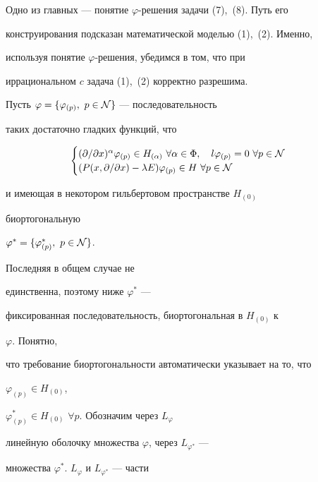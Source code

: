  


Одно из главных --- понятие $\varphi$-решения задачи (7),~(8). Путь его 


конструирования подсказан математической моделью (1),~(2). Именно, 


используя понятие $\varphi$-решения, убедимся в том, что при 


иррациональном $c$ задача (1),~(2) корректно разрешима. 


 


Пусть $\varphi=\{\varphi_{(p)},\ p\in\cal N\}$ --- последовательность 


таких достаточно гладких функций, что 


\begin{equation}


\begin{cases} 


(\partial/\partial x)^\alpha\varphi_{(p)}\in H_{(\alpha)} 


\ \forall\alpha\in\Phi,\quad l\varphi_{(p)}=0\ \forall p\in \cal N\\ 


(P(x,\partial/\partial x)-\lambda E)\varphi_{(p)}\in H 


\ \forall p\in\cal N 


\end{cases} 


\end{equation} 


и имеющая в некотором гильбертовом пространстве $H_{(0)}$ 


биортогональную 


$\varphi^*=\{\varphi^*_{(p)},\ p\in\cal N\}$. 


Последняя в общем случае не 


единственна, поэтому ниже $\varphi^*$ --- 


фиксированная последовательность, биортогональная в $H_{(0)}$ к 


$\varphi$. Понятно, 


что требование биортогональности автоматически указывает на то, что 


$\varphi_{(p)}\in H_{(0)}$, 


$\varphi^*_{(p)}\in H_{(0)}$ $\forall p$. Обозначим через $L_\varphi$ 


линейную оболочку множества $\varphi$, через $L_{\varphi^*}$ --- 


множества $\varphi^*$.\; $L_\varphi$ и $L_{\varphi^*}$ --- части 


